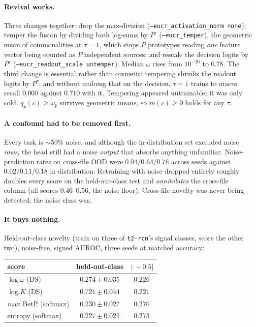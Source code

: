 \documentclass{article}
\begin{document}
\paragraph{Revival works.} Three changes together: drop the max-division
(\texttt{--eucr\_activation\_norm none}); temper the fusion by dividing both
log-sums by $P^{\tau}$ (\texttt{--eucr\_temper}), the geometric mean of
commonalities at $\tau=1$, which stops $P$ prototypes reading \emph{one} feature
vector being counted as $P$ independent sources; and rescale the decision logits
by $P^{\tau}$ (\texttt{--eucr\_readout\_scale untemper}). Median $\omega$ rises
from $10^{-20}$ to $0.78$. The third change is essential rather than cosmetic:
tempering shrinks the readout logits by $P^\tau$, and without undoing that on the
decision, $\tau=1$ trains to macro recall $0.000$ against $0.710$ with it.
Tempering appeared untrainable; it was only cold. $q_p(c)\ge\omega_p$ survives
geometric means, so $m(c)\ge0$ holds for any $\tau$.

\paragraph{A confound had to be removed first.} Every task is $\sim$50\% noise,
and although the in-distribution set excluded noise \emph{rows}, the head still
had a noise \emph{output} that absorbs anything unfamiliar. Noise-prediction
rates on cross-file OOD were $0.04/0.64/0.76$ across seeds against
$0.02/0.11/0.18$ in-distribution. Retraining with noise dropped entirely roughly
doubles every score on the held-out-class test and \emph{annihilates} the
cross-file column (all scores $0.46$--$0.56$, the noise floor). Cross-file
novelty was never being detected; the noise class was.

\paragraph{It buys nothing.} Held-out-class novelty (train on three of
\texttt{t2-rcn}'s signal classes, score the other two), noise-free, signed AUROC,
three seeds at matched accuracy:

\begin{center}
\begin{tabular}{lcc}
\toprule
score & held-out-class & $|{\cdot}-0.5|$ \\
\midrule
$\log\omega$ (DS)   & $0.274\pm0.035$ & $0.226$ \\
$\log K$ (DS)        & $0.721\pm0.044$ & $0.221$ \\
max BetP (softmax)   & $0.230\pm0.027$ & $\mathbf{0.270}$ \\
entropy (softmax)    & $0.227\pm0.025$ & $\mathbf{0.273}$ \\
\bottomrule
\end{tabular}
\end{center}
\end{document}
